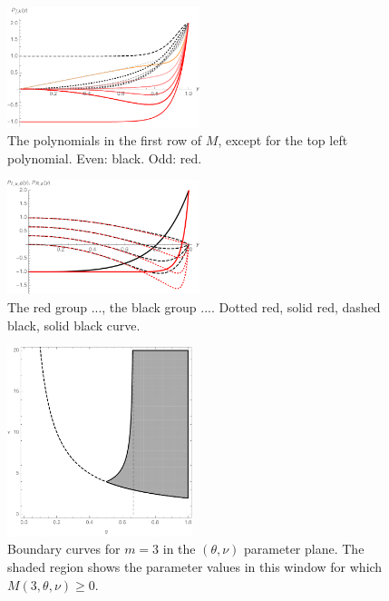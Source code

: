\documentclass[a4paper]{article}
\newcommand{\te}{\theta}
\begin{document}
\begin{figure}
\begin{center}
\includegraphics[width=0.5\textwidth]{fig_excepttopleft.pdf}
\caption{The polynomials in the first row of $M$, except for the top left polynomial. Even: black. Odd: red.}\label{fig_excepttopleft}
\end{center}
\end{figure}

\begin{figure}
\begin{center}
\includegraphics[width=0.5\textwidth]{fig_someplpr.pdf}
\caption{The red group ..., the black group .... Dotted red, solid red, dashed black, solid black curve.}\label{fig_someplpr}
\end{center}
\end{figure}

\begin{figure}
\begin{center}
\includegraphics[width=0.48\textwidth]{fig_boundary.pdf}
\caption{Boundary curves for $m=3$ in the $(\te,\nu)$ parameter plane. The shaded region shows the parameter values in this window for which $M(3,\te,\nu)\ge 0$.}\label{fig_boundary}
\end{center}
\end{figure}
\end{document}
